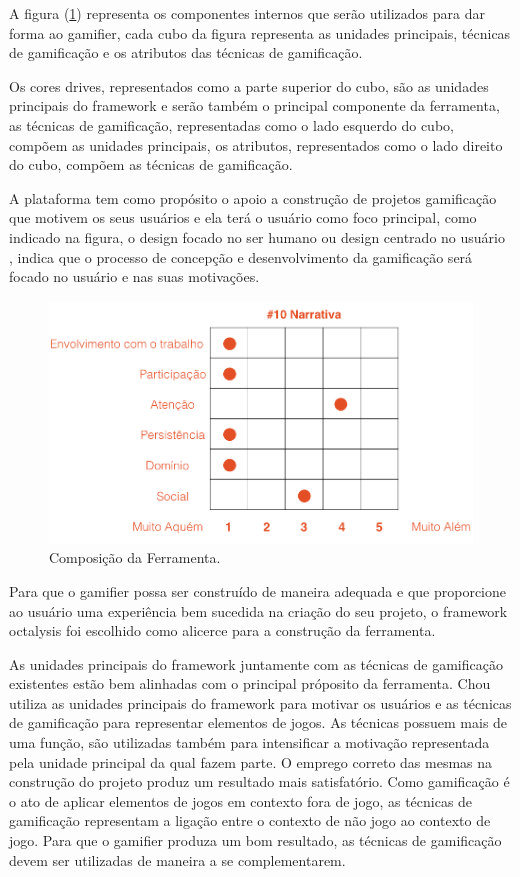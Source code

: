 A figura (\ref{fig01}) representa os componentes internos que serão utilizados para dar forma ao gamifier, cada cubo da figura representa as unidades principais, técnicas de gamificação e os atributos das técnicas de gamificação. 

Os cores drives, representados como a parte superior do cubo, são as unidades principais do framework e serão também o principal componente da ferramenta, as técnicas de gamificação, representadas como o lado esquerdo do cubo, compõem as unidades principais, os atributos, representados como o lado direito do cubo, compõem as técnicas de gamificação. 

A plataforma tem como propósito o apoio a construção de projetos gamificação que motivem os seus usuários e ela terá o usuário como foco principal, como indicado na figura, o design focado no ser humano \cite{chou2015actionable} ou design centrado no usuário \cite{kumar2013gamification}, indica que o processo de concepção e desenvolvimento da gamificação será focado no usuário e nas suas motivações. 


\begin{figure}[h]
	\centering
		\includegraphics[keepaspectratio=true,scale=0.5]{figuras/notas.png}
	\caption{Composição da Ferramenta.\label{fig01}}
\end{figure}

Para que o gamifier possa ser construído de maneira adequada e que proporcione ao usuário uma experiência bem sucedida na criação do seu projeto, o framework octalysis foi escolhido como alicerce para a construção da ferramenta.

As unidades principais do framework juntamente com as técnicas de gamificação existentes estão bem alinhadas com o principal próposito da ferramenta. 
Chou utiliza as unidades principais do framework para motivar os usuários e as técnicas de gamificação para representar elementos de jogos. As técnicas possuem mais de uma função, são utilizadas também para intensificar a motivação representada pela unidade principal da qual fazem parte. O emprego correto das mesmas na construção do projeto produz um resultado mais satisfatório. Como gamificação é o ato de aplicar elementos de jogos em contexto fora de jogo, as técnicas de gamificação representam a ligação entre o contexto de não jogo ao contexto de jogo. Para que o gamifier produza um bom resultado, as técnicas de gamificação devem ser utilizadas de maneira a se complementarem.

